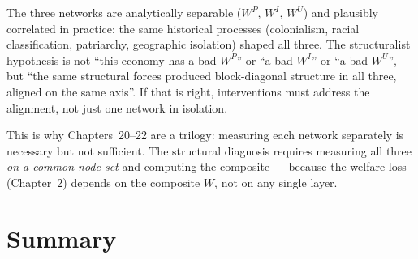\documentclass[../structural_economics_book.tex]{subfiles}
\begin{document}
\begin{keyinsight}
The three networks are analytically separable ($W^P$, $W^I$, $W^U$) and plausibly correlated in practice: the same historical processes (colonialism, racial classification, patriarchy, geographic isolation) shaped all three. The structuralist hypothesis is not ``this economy has a bad $W^P$'' or ``a bad $W^I$'' or ``a bad $W^U$'', but ``the same structural forces produced block-diagonal structure in all three, aligned on the same axis''. If that is right, interventions must address the alignment, not just one network in isolation.

This is why Chapters~20--22 are a trilogy: measuring each network separately is necessary but not sufficient. The structural diagnosis requires measuring all three \emph{on a common node set} and computing the composite --- because the welfare loss (Chapter~2) depends on the composite $W$, not on any single layer.
\end{keyinsight}


\section{Summary}
\label{ch22:sec:summary}
\end{document}

